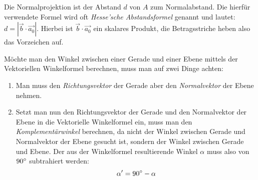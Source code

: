 \begin{figure}[h!]
  \centering
\end{figure}


Die Normalprojektion ist der Abstand $d$ von $A$ zum Normalabstand. Die hierf\"{u}r verwendete Formel wird oft \emph{Hesse'sche Abstandsformel} genannt und lautet: $d = |\vec{b} \cdot \vec{a_0}|$. Hierbei ist $\vec{b} \cdot \vec{a_0}$ ein skalares Produkt, die Betragsstriche heben also das Vorzeichen auf.

\begin{figure}[h!]
  \centering
\end{figure}


M\"{o}chte man den Winkel zwischen einer Gerade und einer Ebene mittels der Vektoriellen Winkelformel berechnen, muss man auf zwei Dinge achten:

\begin{enumerate}
  \item Man muss den \emph{Richtungsvektor} der Gerade aber den \emph{Normalvektor} der Ebene nehmen.

  \item Setzt man nun den Richtungsvektor der Gerade und den Normalvektor der Ebene in die Vektorielle Winkelformel ein, muss man den \emph{Komplement\"{a}rwinkel} berechnen, da nicht der Winkel zwischen Gerade und Normalvektor der Ebene gesucht ist, sondern der Winkel zwischen Gerade und Ebene. Der aus der Winkelformel resultierende Winkel $\alpha$ muss also von $90\degree$ subtrahiert werden: $$\alpha' = 90\degree - \alpha$$
\end{enumerate}

